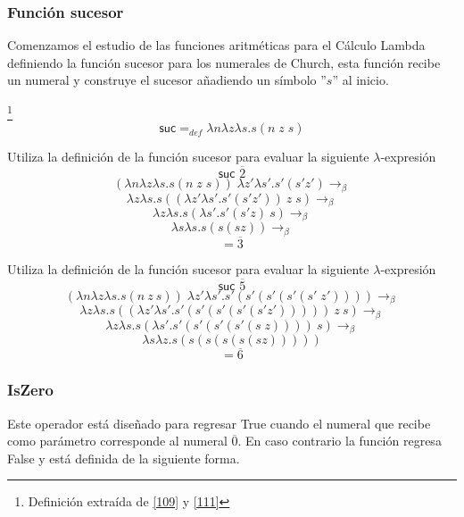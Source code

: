     \subsubsection{Función sucesor}
        Comenzamos el estudio de las funciones aritméticas para el Cálculo Lambda definiendo la función sucesor para los numerales de Church, esta función recibe un numeral y construye el sucesor añadiendo un símbolo ''$s$'' al inicio.
        \begin{definition}\footnote{Definición extraída de \hyperlink{109}{[109]} y  \hyperlink{111}{[111]}}
            $$\textsf{suc} =_{def} \lambda n\lambda z\lambda s. s(n \; z \; s)$$
        \end{definition}
     
        \begin{exercise}
            Utiliza la definición de la función sucesor para evaluar la siguiente  $\lambda$-expresión
            \[
                \textsf{suc } \overline{2}
            \]
            \[
                (\lambda n\lambda z\lambda s.s(n \; z \; s) ) \; \lambda z'\lambda s'.s'(s'z') \rightarrow_\beta 
            \]
		\[
			\lambda z\lambda s.s((\lambda z'\lambda s'.s'(s'z'))\ z \; s) \rightarrow_\beta 
		\]	
            \[
                 \lambda z\lambda s.s(\lambda s'.s'(s'z)\ s) \rightarrow_\beta
            \]
		\[
			\lambda s\lambda s.s(s(sz)) \rightarrow_\beta
		\]
            \[
                = \overline{3}
            \]
        \end{exercise}

        \begin{exercise}
            Utiliza la definición de la función sucesor para evaluar la siguiente  $\lambda$-expresión
            \[
                \textsf{suc } \overline{5}
            \]
            \[
                (\lambda n\lambda z\lambda s.s(n\ z\ s)) \; \lambda z'\lambda s'.s'(s'(s'(s'(s' \; z')))) \rightarrow_\beta
            \]
		\[
			 \lambda z\lambda s.s((\lambda z'\lambda s'.s'(s'(s'(s'(s'z')))))\ z\ s)  \rightarrow_\beta	
		\]
            \[
                \lambda z\lambda s.s(\lambda s'.s'(s'(s'(s'(s\;z))))\ s) \rightarrow_\beta 
            \]
		\[
			\lambda s\lambda z.s(s(s(s(s(sz)))))
		\]
            \[
                = \overline{6}
            \]
        \end{exercise}

        \subsubsection{IsZero}
        	Este operador está diseñado para regresar \textsf{True} cuando el numeral que recibe como parámetro corresponde al numeral $\overline{0}$. En caso contrario la función regresa \textsf{False} y está definida de la siguiente forma.
        
